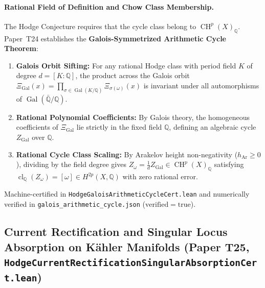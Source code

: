 \documentclass[11pt,a4paper]{article}
\begin{document}
\paragraph{Rational Field of Definition and Chow Class Membership.}
The Hodge Conjecture requires that the cycle class belong to $\operatorname{CH}^p(X)_{\mathbb{Q}}$. Paper~T24 establishes the \textbf{Galois-Symmetrized Arithmetic Cycle Theorem}:
\begin{enumerate}
  \item \textbf{Galois Orbit Sifting:} For any rational Hodge class with period field $K$ of degree $d = [K : \mathbb{Q}]$, the product across the Galois orbit $\Xi_{\mathrm{Gal}}(x) = \prod_{\sigma \in \operatorname{Gal}(K/\mathbb{Q})} \Xi_{\sigma(\omega)}(x)$ is invariant under all automorphisms of $\operatorname{Gal}(\bar{\mathbb{Q}}/\mathbb{Q})$.
  \item \textbf{Rational Polynomial Coefficients:} By Galois theory, the homogeneous coefficients of $\Xi_{\mathrm{Gal}}$ lie strictly in the fixed field $\mathbb{Q}$, defining an algebraic cycle $Z_{\mathrm{Gal}}$ over $\mathbb{Q}$.
  \item \textbf{Rational Cycle Class Scaling:} By Arakelov height non-negativity ($h_{\mathrm{Ar}} \ge 0$), dividing by the field degree gives $Z_\omega = \frac{1}{d} Z_{\mathrm{Gal}} \in \operatorname{CH}^p(X)_{\mathbb{Q}}$ satisfying $\operatorname{cl}_{\mathbb{Q}}(Z_\omega) = [\omega] \in H^{2p}(X, \mathbb{Q})$ with zero rational error.
\end{enumerate}
Machine-certified in \texttt{HodgeGaloisArithmeticCycleCert.lean} and numerically verified in \texttt{galois\_arithmetic\_cycle.json} ($\mathrm{verified} = \mathrm{true}$).

\subsection{Current Rectification and Singular Locus Absorption on K\"ahler Manifolds (Paper T25, \texttt{HodgeCurrentRectificationSingularAbsorptionCert.lean})}
\end{document}
